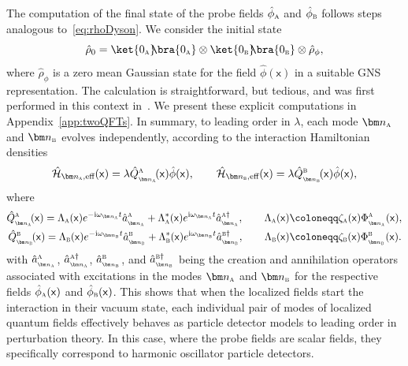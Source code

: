 \documentclass[letterpaper,12pt,titlepage,oneside,final]{book}
\newcommand{\mf}{\mathsf}%
\newcommand{\ii}{\mathrm{i}}
\newcommand{\tc}[1]{\textsc{#1}}
\begin{document}
    The computation of the final state of the probe fields $\hat{\phi}_\tc{a}$ and $\hat{\phi}_\tc{b}$ follows steps analogous to~\eqref{eq:rhoDyson}. We consider the initial state 
    \begin{equation}\label{eq:rho02fields}
        \hat{\rho}_0 = \ket{0_\tc{a}}\!\!\bra{0_\tc{a}} \otimes \ket{0_\tc{b}}\!\!\bra{0_\tc{b}} \otimes \hat{\rho}_\phi,
    \end{equation}
    where $\hat{\rho}_\phi$ is a zero mean Gaussian state for the field $\hat{\phi}(\mf x)$ in a suitable GNS representation. The calculation is straightforward, but tedious, and was first performed in this context in~\cite{FullHarvesting}. We present these explicit computations in Appendix~\ref{app:twoQFTs}. In summary, to leading order in $\lambda$, each mode $\bm n_\tc{a}$ and $\bm n_\tc{b}$ evolves independently, according to the interaction Hamiltonian densities
    \begin{equation}\label{eq:hIABQFT}
        \hat{\mathcal{H}}_{\bm n_\tc{a},\text{eff}}(\mf x) = \lambda \hat{Q}_{{}_{\bm n_\tc{a}}}^{\tc{a}}\!(\mf x) \hat{\phi}(\mf x), \quad \quad  \hat{\mathcal{H}}_{\bm n_\tc{b},\text{eff}}(\mf x) = \lambda \hat{Q}_{{}_{\bm n_\tc{b}}}^{\tc{b}}\!(\mf x) \hat{\phi}(\mf x),
    \end{equation}
    where
    \begin{align}
        \hat{Q}_{{}_{\bm n_\tc{a}}}^{\tc{a}}\!(\mf x) = \Lambda_\tc{a}(\mf x) e^{- \ii \omega_{\bm n_\tc{a}} t}\hat{a}^{\tc{a}}_{{}_{\bm n_\tc{a}}}+\Lambda^*_\tc{a}(\mf x) e^{\ii \omega_{\bm n_\tc{a}} t}\hat{a}^{\tc{a}\dagger}_{{}_{\bm n_\tc{a}}},\quad\quad \Lambda_\tc{a}(\mf x) &\coloneqq \zeta_\tc{a}(\mf x) \Phi^{\tc{a}}_{{}_{\bm n_\tc{a}}}(\mf x),\\
        \hat{Q}_{{}_{\bm n_\tc{b}}}^\tc{b}\!(\mf x) = \Lambda_\tc{b}(\mf x)e^{- \ii \omega_{\bm n_\tc{b}} t} \hat{a}^{\tc{b}}_{{}_{\bm n_\tc{b}}}+\Lambda^\ast_\tc{b}(\mf x) e^{\ii \omega_{\bm n_\tc{b}} t}\hat{a}^{\tc{b}\dagger}_{{}_{\bm n_\tc{b}}},\quad \quad
        \Lambda_\tc{b}(\mf x) &\coloneqq \zeta_\tc{b}(\mf x) \Phi^{\tc{b}}_{{}_{\bm n_\tc{b}}}(\mf x).
    \end{align}
    with $\hat{a}^{\tc{a}}_{{}_{\bm n_\tc{a}}}$, $\hat{a}^{\tc{a}\dagger}_{{}_{\bm n_\tc{a}}}$, $\hat{a}^{\tc{b}}_{{}_{\bm n_\tc{b}}}$, and $\hat{a}^{\tc{b}\dagger}_{{}_{\bm n_\tc{b}}}$ being the creation and annihilation operators associated with excitations in the modes $\bm n_\tc{a}$ and $\bm n_\tc{b}$ for the respective fields $\hat{\phi}_\tc{a}(\mf x)$ and $\hat{\phi}_\tc{b}(\mf x)$. This shows that when the localized fields start the interaction in their vacuum state, each individual pair of modes of localized quantum fields effectively behaves as particle detector models to leading order in perturbation theory. In this case, where the probe fields are scalar fields, they specifically correspond to harmonic oscillator particle detectors.
\end{document}

